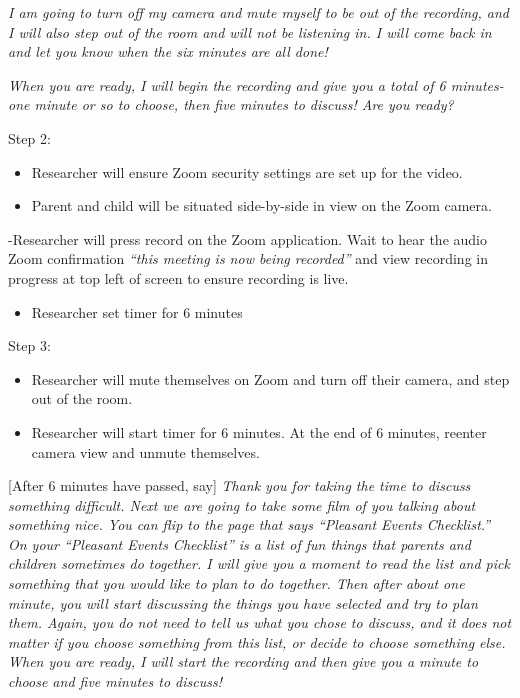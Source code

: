\documentclass[]{book}
\providecommand{\tightlist}{%
  \setlength{\itemsep}{0pt}\setlength{\parskip}{0pt}}
\begin{document}
\emph{I am going to turn off my camera and mute myself to be out of the recording, and I will also step out of the room and will not be listening in. I will come back in and let you know when the six minutes are all done!}

\emph{When you are ready, I will begin the recording and give you a total of 6 minutes- one minute or so to choose, then five minutes to discuss! Are you ready?}

Step 2:

\begin{itemize}
\item
  Researcher will ensure Zoom security settings are set up for the video.
\item
  Parent and child will be situated side-by-side in view on the Zoom camera.
\end{itemize}

-Researcher will press record on the Zoom application. Wait to hear the audio Zoom confirmation \emph{``this meeting is now being recorded''} and view recording in progress at top left of screen to ensure recording is live.

\begin{itemize}
\tightlist
\item
  Researcher set timer for 6 minutes
\end{itemize}

Step 3:

\begin{itemize}
\item
  Researcher will mute themselves on Zoom and turn off their camera, and step out of the room.
\item
  Researcher will start timer for 6 minutes. At the end of 6 minutes, reenter camera view and unmute themselves.
\end{itemize}

{[}After 6 minutes have passed, say{]} \emph{Thank you for taking the time to discuss something difficult. Next we are going to take some film of you talking about something nice. You can flip to the page that says ``Pleasant Events Checklist.'' On your ``Pleasant Events Checklist'' is a list of fun things that parents and children sometimes do together. I will give you a moment to read the list and pick something that you would like to plan to do together. Then after about one minute, you will start discussing the things you have selected and try to plan them. Again, you do not need to tell us what you chose to discuss, and it does not matter if you choose something from this list, or decide to choose something else. When you are ready, I will start the recording and then give you a minute to choose and five minutes to discuss!}
\end{document}
